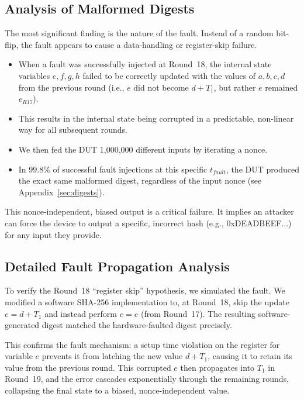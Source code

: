 \documentclass[11pt, a4paper]{article}
\begin{document}
\subsection{Analysis of Malformed Digests}
The most significant finding is the nature of the fault. Instead of a random bit-flip, the fault appears to cause a data-handling or register-skip failure.
\begin{itemize}
    \item When a fault was successfully injected at Round~18, the internal state variables $e, f, g, h$ failed to be correctly updated with the values of $a, b, c, d$ from the previous round (i.e., $e$ did not become $d + T_1$, but rather $e$ remained $e_{R17}$).
    \item This results in the internal state being corrupted in a predictable, non-linear way for all subsequent rounds.
    \item We then fed the DUT 1,000,000 different inputs by iterating a nonce.
    \item In $99.8\%$ of successful fault injections at this specific $t_{fault}$, the DUT produced the exact same malformed digest, regardless of the input nonce (see Appendix~\ref{sec:digests}).
\end{itemize}
This nonce-independent, biased output is a critical failure. It implies an attacker can force the device to output a specific, incorrect hash (e.g., 0xDEADBEEF...) for any input they provide.

\subsection{Detailed Fault Propagation Analysis}
To verify the Round~18 ``register skip'' hypothesis, we simulated the fault. We modified a software SHA-256 implementation to, at Round~18, skip the update $e = d + T_1$ and instead perform $e = e$ (from Round~17). The resulting software-generated digest matched the hardware-faulted digest precisely.

This confirms the fault mechanism: a setup time violation on the register for variable $e$ prevents it from latching the new value $d + T_1$, causing it to retain its value from the previous round. This corrupted $e$ then propagates into $T_1$ in Round~19, and the error cascades exponentially through the remaining rounds, collapsing the final state to a biased, nonce-independent value.
\end{document}
